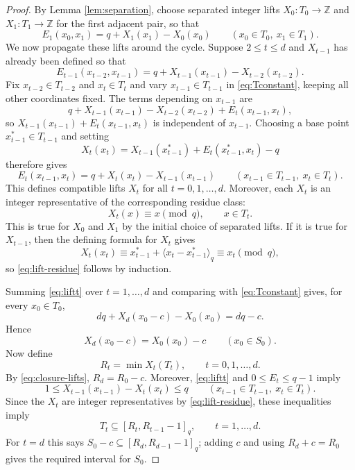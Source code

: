 \documentclass[11pt]{article}
\theoremstyle{definition}
\theoremstyle{remark}
\begin{document}
\begin{proof}
By Lemma \ref{lem:separation}, choose separated integer lifts $X_0:T_0\to\mathbb Z$ and $X_1:T_1\to\mathbb Z$ for the first adjacent pair, so that
\begin{equation}
        E_1(x_0,x_1)=q+X_1(x_1)-X_0(x_0)
        \qquad(x_0\in T_0,
        \ x_1\in T_1).
        \label{eq:lift1}
\end{equation}
We now propagate these lifts around the cycle.  Suppose $2\le t\le d$ and $X_{t-1}$ has already been defined so that
\[
        E_{t-1}(x_{t-2},x_{t-1})
        =q+X_{t-1}(x_{t-1})-X_{t-2}(x_{t-2}).
\]
Fix $x_{t-2}\in T_{t-2}$ and $x_t\in T_t$ and vary $x_{t-1}\in T_{t-1}$ in \eqref{eq:Tconstant}, keeping all other coordinates fixed.  The terms depending on $x_{t-1}$ are
\[
        q+X_{t-1}(x_{t-1})-X_{t-2}(x_{t-2})
        +E_t(x_{t-1},x_t),
\]
so $X_{t-1}(x_{t-1})+E_t(x_{t-1},x_t)$ is independent of $x_{t-1}$.  Choosing a base point $x_{t-1}^*\in T_{t-1}$ and setting
\[
        X_t(x_t)=X_{t-1}(x_{t-1}^*)+E_t(x_{t-1}^*,x_t)-q
\]
therefore gives
\begin{equation}
        E_t(x_{t-1},x_t)=q+X_t(x_t)-X_{t-1}(x_{t-1})
        \qquad(x_{t-1}\in T_{t-1},
        \ x_t\in T_t).
        \label{eq:liftt}
\end{equation}
This defines compatible lifts $X_t$ for all $t=0,1,\ldots,d$.  Moreover, each $X_t$ is an integer representative of the corresponding residue class:
\begin{equation}
        X_t(x)\equiv x\pmod q,
        \qquad x\in T_t .
        \label{eq:lift-residue}
\end{equation}
This is true for $X_0$ and $X_1$ by the initial choice of separated lifts.  If it is true for $X_{t-1}$, then the defining formula for $X_t$ gives
\[
        X_t(x_t)\equiv x_{t-1}^*+\langle x_t-x_{t-1}^*\rangle_q\equiv x_t\pmod q,
\]
so \eqref{eq:lift-residue} follows by induction.

Summing \eqref{eq:liftt} over $t=1,\ldots,d$ and comparing with \eqref{eq:Tconstant} gives, for every $x_0\in T_0$,
\[
        dq+X_d(x_0-c)-X_0(x_0)=dq-c .
\]
Hence
\begin{equation}
        X_d(x_0-c)=X_0(x_0)-c
        \qquad(x_0\in S_0).
        \label{eq:closure-lifts}
\end{equation}
Now define
\[
        R_t=\min X_t(T_t),
        \qquad t=0,1,\ldots,d .
\]
By \eqref{eq:closure-lifts}, $R_d=R_0-c$.  Moreover, \eqref{eq:liftt} and $0\le E_t\le q-1$ imply
\[
        1\le X_{t-1}(x_{t-1})-X_t(x_t)\le q
        \qquad(x_{t-1}\in T_{t-1},
        \ x_t\in T_t).
\]
Since the $X_t$ are integer representatives by \eqref{eq:lift-residue}, these inequalities imply
\begin{equation}
        T_t\subseteq [R_t,R_{t-1}-1]_q,
        \qquad t=1,\ldots,d .
        \label{eq:nec-lift-inclusion}
\end{equation}
For $t=d$ this says $S_0-c\subseteq [R_d,R_{d-1}-1]_q$; adding $c$ and using $R_d+c=R_0$ gives the required interval for $S_0$.


\end{proof}
\end{document}
